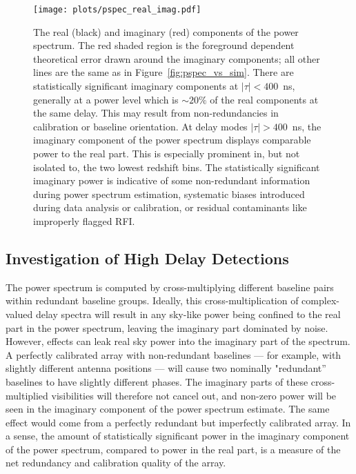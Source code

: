 \begin{figure}[tp]
\centering
\texttt{[image: plots/pspec\_real\_imag.pdf]}
\caption{The real (black) and imaginary (red) components of the
power spectrum. The red shaded region is the 
foreground dependent theoretical error drawn around the 
imaginary components; all other lines are the same as in Figure~\ref{fig:pspec_vs_sim}. There are statistically significant imaginary components at
$ |\tau| < 400 $~ns, generally at a power level
which is $ \sim 20\% $ of the real components at the same delay.
This may result from non-redundancies in calibration or baseline orientation. At delay modes $ |\tau| > 400 $~ns, the imaginary
component of the power spectrum displays comparable power to the 
real part. This is especially prominent in, but not isolated to, the two lowest redshift bins. The statistically significant imaginary power is indicative of some non-redundant information 
during power spectrum estimation, systematic biases introduced during data analysis or calibration, 
or residual contaminants like improperly flagged RFI.
}
\label{fig:real_imag}
\end{figure}

\subsection{Investigation of High Delay Detections}

The power spectrum is computed by cross-multiplying
different baseline pairs within redundant baseline groups.
Ideally, this cross-multiplication of complex-valued
delay spectra will result in any sky-like power being confined to the real part in the power spectrum, leaving the imaginary part dominated by noise.
However, effects can leak real sky power into the
imaginary part of the spectrum.
A perfectly calibrated array with non-redundant baselines
--- for example, with slightly different antenna positions ---
will cause two nominally "redundant'' baselines to have slightly different phases.
The imaginary parts of these cross-multiplied visibilities will therefore not cancel out, and non-zero power will be seen in the imaginary component of the power spectrum estimate.
The same effect would come from a perfectly redundant but imperfectly calibrated array.
In a sense, the amount of statistically significant power in the imaginary component of the power spectrum, compared to power in the real part, is a measure of the net redundancy and calibration quality of the array.

